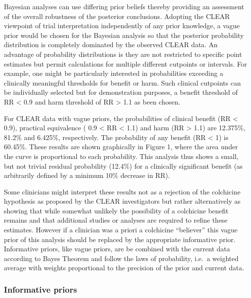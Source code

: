 \documentclass[
  letterpaper,
  DIV=11,
  numbers=noendperiod]{scrartcl}
\begin{document}
Bayesian analyses can use differing prior beliefs thereby providing an
assessment of the overall robustness of the posterior conclusions.
Adopting the CLEAR viewpoint of trial interpretation independently of
any prior knowledge, a vague prior would be chosen for the Bayesian
analysis so that the posterior probability distribution is completely
dominated by the observed CLEAR data. An advantage of probability
distributions is they are not restricted to specific point estimates but
permit calculations for multiple different cutpoints or intervals. For
example, one might be particularly interested in probabilities exceeding
a clinically meaningful thresholds for benefit or harm. Such clinical
cutpoints can be individually selected but for demonstration purposes, a
benefit threshold of RR \textless{} 0.9 and harm threshold of RR
\textgreater{} 1.1 as been chosen.

For CLEAR data with vague priors, the probabilities of clinical benefit
(RR \textless{} 0.9), practical equivalence ( 0.9 \textless{} RR
\textless{} 1.1) and harm (RR \textgreater{} 1.1) are 12.375\%, 81.2\%
and 6.425\%, respectively. The probability of any benefit (RR
\textless{} 1) is 60.45\%. These results are shown graphically in Figure
1, where the area under the curve is proportional to each probability.
This analysis thus shows a small, but not trivial residual probability
(12.4\%) for a clinically significant benefit (as arbitrarily defined by
a minimum 10\% decrease in RR).~

Some clinicians might interpret these results not as a rejection of the
colchicine hypothesis as proposed by the CLEAR investigators but rather
alternatively as showing that while somewhat unlikely the possibility of
a colchicine benefit remains and that additional studies or analyses are
required to refine these estimates. However if a clinician was a priori
a colchicine ``believer'' this vague prior of this analysis should be
replaced by the appropriate informative prior. Informative priors, like
vague priors, are be combined with the current data according to Bayes
Theorem and follow the laws of probability, i.e.~a weighted average with
weights proportional to the precision of the prior and current data.

\subsubsection{Informative priors}\label{informative-priors}
\end{document}
